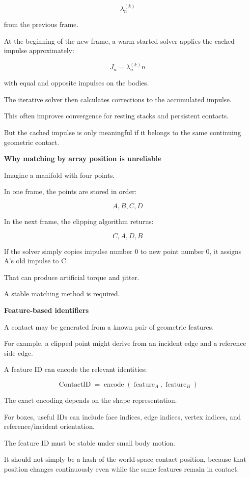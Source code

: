 \[
\lambda_n^{(k)}
\]

from the previous frame.

At the beginning of the new frame, a warm-started solver applies the cached impulse approximately:

\[
\boxed{ J_n=\lambda_n^{(k)}n }
\]

with equal and opposite impulses on the bodies.

The iterative solver then calculates corrections to the accumulated impulse.

This often improves convergence for resting stacks and persistent contacts.

But the cached impulse is only meaningful if it belongs to the same continuing geometric contact.

\textbf{Why matching by array position is unreliable}

Imagine a manifold with four points.

In one frame, the points are stored in order:

\[
A,B,C,D
\]

In the next frame, the clipping algorithm returns:

\[
C,A,D,B
\]

If the solver simply copies impulse number 0 to new point number 0, it assigns A's old impulse to C.

That can produce artificial torque and jitter.

A stable matching method is required.

\textbf{Feature-based identifiers}

A contact may be generated from a known pair of geometric features.

For example, a clipped point might derive from an incident edge and a reference side edge.

A feature ID can encode the relevant identities:

\[
\boxed{ \operatorname{ContactID} = \operatorname{encode}(\operatorname{feature}_A,\operatorname{feature}_B) }
\]

The exact encoding depends on the shape representation.

For boxes, useful IDs can include face indices, edge indices, vertex indices, and reference/incident orientation.

The feature ID must be stable under small body motion.

It should not simply be a hash of the world-space contact position, because that position changes continuously even while the same features remain in contact.

